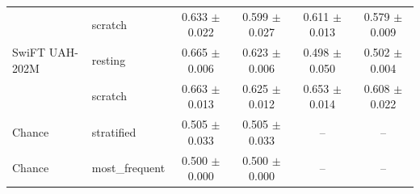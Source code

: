\begin{table}[H]
{\begin{tabular}{llcccc}
 & scratch & 0.633 $\pm$ 0.022 & 0.599 $\pm$ 0.027 & 0.611 $\pm$ 0.013 & 0.579 $\pm$ 0.009 \\
SwiFT UAH-202M & resting & 0.665 $\pm$ 0.006 & 0.623 $\pm$ 0.006 & 0.498 $\pm$ 0.050 & 0.502 $\pm$ 0.004 \\
 & scratch & 0.663 $\pm$ 0.013 & 0.625 $\pm$ 0.012 & 0.653 $\pm$ 0.014 & 0.608 $\pm$ 0.022 \\
\midrule
Chance & stratified & 0.505 $\pm$ 0.033 & 0.505 $\pm$ 0.033 & -- & -- \\
Chance & most\_frequent & 0.500 $\pm$ 0.000 & 0.500 $\pm$ 0.000 & -- & -- \\
\bottomrule
\end{tabular}%
}
\end{table}